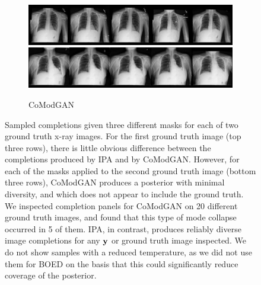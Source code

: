 \begin{figure}[t]
\begin{subfigure}[t]{0.4\textwidth}
    \includegraphics[height=\xrayimgheight]{figs/cigcvae/image-samples/xray/comodgan_5.jpg}
    \includegraphics[height=\xrayimgheight]{figs/cigcvae/image-samples/xray/comodgan_6.jpg}
    \caption{CoModGAN}
  \end{subfigure}
  \caption{Sampled completions given three different masks for each of two
    ground truth x-ray images. For the first ground truth image (top three
    rows), there is little obvious difference between the completions produced
    by IPA and by CoModGAN. However, for each of the masks applied to the second
    ground truth image (bottom three rows), CoModGAN produces a posterior with
    minimal diversity, and which does not appear to include the ground truth. We
    inspected completion panels for CoModGAN on 20 different ground truth
    images, and found that this type of mode collapse occurred in 5 of them.
    IPA, in contrast, produces reliably diverse image completions for any
    ${\mathbf{y}}$ or ground truth image inspected. We do not show samples with a
    reduced temperature, as we did not use them for BOED on the basis that this
    could significantly reduce coverage of the posterior. }
    \label{fig:cigcvae-xray-samples}
  \end{figure}

